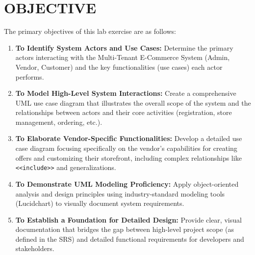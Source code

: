 \chapter{OBJECTIVE}\label{obj}


The primary objectives of this lab exercise are as follows:

\begin{enumerate}
    \item \textbf{To Identify System Actors and Use Cases:} Determine the primary actors interacting with the Multi-Tenant E-Commerce System (Admin, Vendor, Customer) and the key functionalities (use cases) each actor performs.
    
    \item \textbf{To Model High-Level System Interactions:} Create a comprehensive UML use case diagram that illustrates the overall scope of the system and the relationships between actors and their core activities (registration, store management, ordering, etc.).
    
    \item \textbf{To Elaborate Vendor-Specific Functionalities:} Develop a detailed use case diagram focusing specifically on the vendor's capabilities for creating offers and customizing their storefront, including complex relationships like \texttt{\textless{}\textless{}include\textgreater{}\textgreater{}} and generalizations.
    
    \item \textbf{To Demonstrate UML Modeling Proficiency:} Apply object-oriented analysis and design principles using industry-standard modeling tools (Lucidchart) to visually document system requirements.
    
    \item \textbf{To Establish a Foundation for Detailed Design:} Provide clear, visual documentation that bridges the gap between high-level project scope (as defined in the SRS) and detailed functional requirements for developers and stakeholders.
\end{enumerate}
\clearpage
















